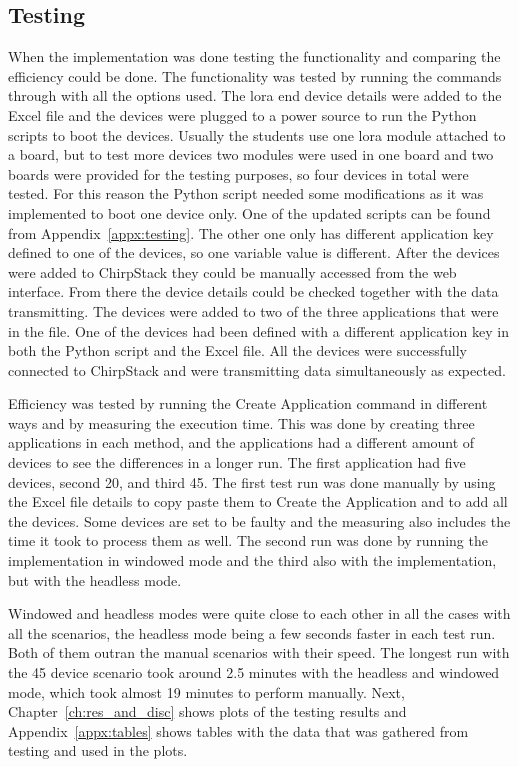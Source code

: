 \clearpage

\subsection{Testing}
When the implementation was done testing the functionality and comparing the efficiency could be done.
The functionality was tested by running the commands through with all the options used.
The \gls{lora} end device details were added to the Excel file and the devices were plugged to a power source to run the Python scripts to boot the devices.
Usually the students use one \gls{lora} module attached to a board, but to test more devices two modules were used in one board and two boards were provided for the testing purposes, so four devices in total were tested.
For this reason the Python script needed some modifications as it was implemented to boot one device only.
One of the updated scripts can be found from Appendix~\ref{appx:testing}.
The other one only has different application key defined to one of the devices, so one variable value is different.
After the devices were added to ChirpStack they could be manually accessed from the web interface.
From there the device details could be checked together with the data transmitting.
The devices were added to two of the three applications that were in the  file.
One of the devices had been defined with a different application key in both the Python script and the Excel file.
All the devices were successfully connected to ChirpStack and were transmitting data simultaneously as expected.

Efficiency was tested by running the Create Application command in different ways and by measuring the execution time.
This was done by creating three applications in each method, and the applications had a different amount of devices to see the differences in a longer run.
The first application had five devices, second 20, and third 45.
The first test run was done manually by using the Excel file details to copy paste them to Create the Application and to add all the devices.
Some devices are set to be faulty and the measuring also includes the time it took to process them as well.
The second run was done by running the implementation in windowed mode and the third also with the implementation, but with the headless mode.

\clearpage

Windowed and headless modes were quite close to each other in all the cases with all the scenarios, the headless mode being a few seconds faster in each test run.
Both of them outran the manual scenarios with their speed.
The longest run with the 45 device scenario took around 2.5 minutes with the headless and windowed mode, which took almost 19 minutes to perform manually.
Next, Chapter~\ref{ch:res_and_disc} shows plots of the testing results and Appendix~\ref{appx:tables} shows tables with the data that was gathered from testing and used in the plots.

\clearpage %
